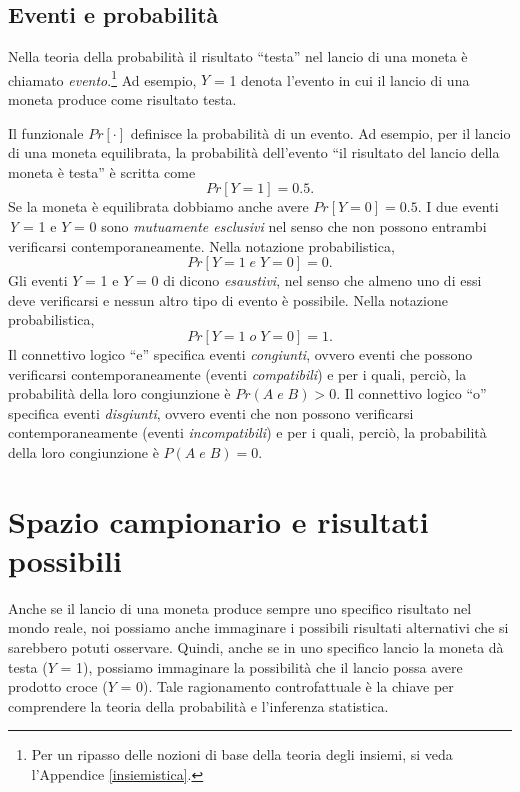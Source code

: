\documentclass[
  10pt,
  italian,
  a4paper,
  extrafontsizes,onecolumn,openright
  ]{memoir}
\theoremstyle{definition}
\theoremstyle{definition}
\theoremstyle{definition}
\theoremstyle{definition}
\theoremstyle{remark}
\begin{document}
\hypertarget{eventi-e-probabilituxe0}{%
\subsection{Eventi e probabilità}\label{eventi-e-probabilituxe0}}

Nella teoria della probabilità il risultato ``testa'' nel lancio di una moneta è chiamato \emph{evento}.\footnote{Per un ripasso delle nozioni di base della teoria degli insiemi, si veda l'Appendice \ref{insiemistica}.} Ad esempio, \(Y\) = 1 denota l'evento in cui il lancio di una moneta produce come risultato testa.

Il funzionale \(Pr[·]\) definisce la probabilità di un evento. Ad esempio, per il lancio di una moneta equilibrata, la probabilità dell'evento ``il risultato del lancio della moneta è testa'' è scritta come
\[
Pr[Y = 1] = 0.5.
\]
Se la moneta è equilibrata dobbiamo anche avere \(Pr[Y = 0] = 0.5\). I due eventi \emph{Y} = 1 e \(Y\) = 0 sono \emph{mutuamente esclusivi} nel senso che non possono entrambi verificarsi contemporaneamente. Nella notazione probabilistica,
\[
Pr[Y = 1\; e \; Y = 0] = 0.
\]
Gli eventi \(Y\) = 1 e \(Y\) = 0 di dicono \emph{esaustivi}, nel senso che almeno uno di essi deve verificarsi e nessun altro tipo di evento è possibile. Nella notazione probabilistica,
\[
Pr[Y = 1\; o \; Y = 0] = 1.
\]
Il connettivo logico ``e'' specifica eventi \emph{congiunti}, ovvero eventi che possono verificarsi contemporaneamente (eventi \emph{compatibili}) e per i quali, perciò, la probabilità della loro congiunzione è \(Pr(A \; e \; B) > 0\).
Il connettivo logico ``o'' specifica eventi \emph{disgiunti}, ovvero eventi che non possono verificarsi contemporaneamente (eventi \emph{incompatibili}) e per i quali, perciò, la probabilità della loro congiunzione è \(P(A \; e \; B) = 0\).

\hypertarget{spazio-campionario-e-risultati-possibili}{%
\section{Spazio campionario e risultati possibili}\label{spazio-campionario-e-risultati-possibili}}

Anche se il lancio di una moneta produce sempre uno specifico risultato nel mondo reale, noi possiamo anche immaginare i possibili risultati alternativi che si sarebbero potuti osservare. Quindi, anche se in uno specifico lancio la moneta dà testa (\(Y\) = 1), possiamo immaginare la possibilità che il lancio possa avere prodotto croce (\(Y\) = 0). Tale ragionamento controfattuale è la chiave per comprendere la teoria della probabilità e l'inferenza statistica.
\end{document}

